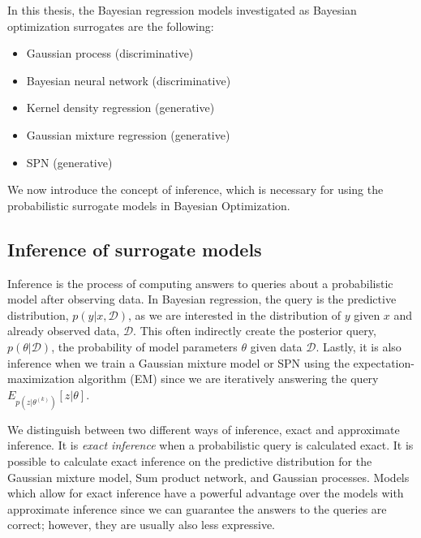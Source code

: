 In this thesis, the Bayesian regression models investigated as Bayesian optimization surrogates are
the following:
\begin{itemize}[noitemsep]
    \item Gaussian process (discriminative)
    \item Bayesian neural network (discriminative)
    \item Kernel density regression (generative)
    \item Gaussian mixture regression (generative)
    \item SPN (generative)
\end{itemize}

We now introduce the concept of inference, which is necessary for using the probabilistic surrogate models
in Bayesian Optimization. 

\subsection{Inference of surrogate models}
Inference is the process of computing answers to queries about a probabilistic model after observing
data. In Bayesian regression, the query is the predictive distribution, $p(y|x,\mathcal{D})$, as we
are interested in the distribution of $y$ given $x$ and already observed data, $\mathcal{D}$. This
often indirectly create the posterior query, $p(\theta|\mathcal{D})$, the probability of model
parameters $\theta$ given data $\mathcal{D}$. Lastly, it is also inference when we train a Gaussian
mixture model or SPN using the expectation-maximization algorithm (EM) since we are iteratively
answering the query $E_{p(z|\theta^{(k)})}[z|\theta]$.

We distinguish between two different ways of inference, exact and approximate inference. It is
\textit{exact inference} when a probabilistic query is calculated exact. It is possible to
calculate exact inference on the predictive distribution for the Gaussian mixture model, Sum product
network, and Gaussian processes. Models which allow for exact inference have a powerful advantage
over the models with approximate inference since we can guarantee the answers to the queries are
correct; however, they are usually also less expressive.


